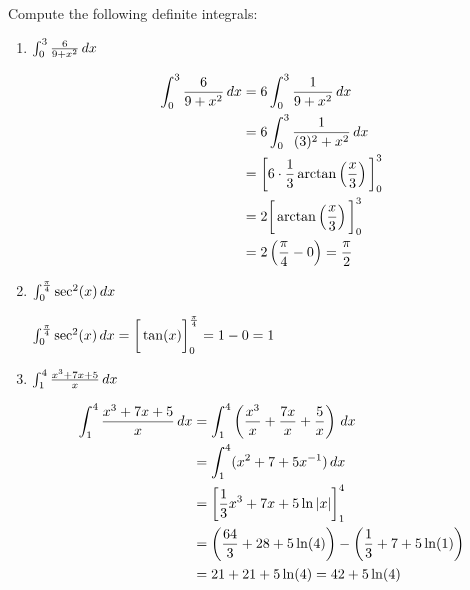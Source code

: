 \documentclass[handout,nooutcomes]{ximera}
\begin{document}
\begin{problem}
Compute the following definite integrals:
	\begin{enumerate}
	
	\item  $\int_0^3 \frac{6}{9 + x^2} \,d x $
		\begin{freeResponse}
			\begin{align*}
			\int_0^3 \frac{6}{9 + x^2} \,d x &= 6 \int_0^3 \frac{1}{9 + x^2} \,d x  \\
			&= 6 \int_0^3 \frac{1}{(3)^2 + x^2} \,d x  \\
			&= \bigg[ 6 \cdot \frac{1}{3} \arctan \left( \frac{x}{3} \right) \bigg]_0^3  \\
			&= 2 \bigg[  \arctan \left( \frac{x}{3} \right) \bigg]_0^3  \\
			&= 2 \left( \frac{\pi}{4} - 0 \right) = \frac{\pi}{2}
			\end{align*}
		\end{freeResponse}
		
		
		
	\item  $\int_0^{\frac{\pi}{4}} \sec^2 (x) \,d x$
		\begin{freeResponse}
		$\int_0^{\frac{\pi}{4}} \sec^2 (x) \,d x = \bigg[ \tan(x) \bigg]_0^{\frac{\pi}{4}} = 1 - 0 = 1$
		\end{freeResponse}
		
		
		
	\item  $\int_1^4 \frac{x^3 + 7x + 5}{x} \,d x$
		\begin{freeResponse}
			\begin{align*}
			\int_1^4 \frac{x^3 + 7x + 5}{x} \,d x &= \int_1^4 \left( \frac{x^3}{x} + \frac{7x}{x} + \frac{5}{x} \right) \,d x  \\
			&= \int_1^4 ( x^2 + 7 + 5x^{-1} ) \,d x  \\
			&= \bigg[ \frac{1}{3} x^3 + 7x + 5\ln |x|  \bigg]_1^4  \\
			&= \left( \frac{64}{3} + 28 + 5\ln(4) \right) - \left( \frac{1}{3} + 7 + 5 \ln(1) \right)  \\
			&= 21 + 21 + 5\ln(4) = 42 + 5\ln(4)
			\end{align*}
		\end{freeResponse}
		
		
		

\end{enumerate}
\end{problem}
\end{document}

